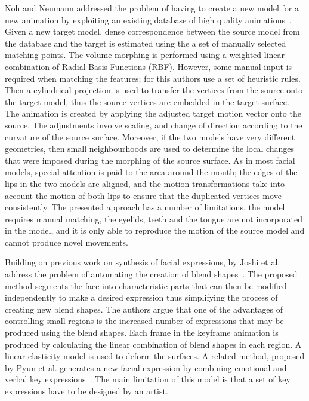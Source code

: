 \documentclass[11pt]{report}
\begin{document}
Noh and Neumann addressed the problem of having to create a new model for a new animation by exploiting an existing database of high quality animations~\cite{Noh:2001}. Given a new target model, dense correspondence between the source model from the database and the target is estimated using the a set of manually selected matching points. The volume morphing is performed using a weighted linear combination of Radial Basis Functions (RBF). However, some manual input is required when matching the features; for this authors use a set of heuristic rules. Then a cylindrical projection is used to transfer the vertices from the source onto the target model, thus the source vertices are embedded in the target surface. The animation is created by applying the adjusted target motion vector onto the source. The adjustments involve scaling, and change of direction according to the curvature of the source surface. Moreover, if the two models have very different geometries, then small neighbourhoods are used to determine the local changes that were imposed during the morphing of the source surface. As in most facial models, special attention is paid to the area around the mouth; the edges of the lips in the two models are aligned, and the motion transformations take into account the motion of both lips to ensure that the duplicated vertices move consistently. The presented approach has a number of limitations, the model requires manual matching, the eyelids, teeth and the tongue are not incorporated in the model, and it is only able to reproduce the motion of the source model and cannot produce novel movements. 

Building on previous work on synthesis of facial expressions, by Joshi et al. address the problem of automating the creation of blend shapes~\cite{Joshi:2003}. The proposed method segments the face into characteristic parts that can then be modified independently to make a desired expression thus simplifying the process of creating new blend shapes. The authors argue that one of the advantages of controlling small regions is the increased number of expressions that may be produced using the blend shapes. Each frame in the keyframe animation is produced by calculating the linear combination of blend shapes in each region. A linear elasticity model is used to deform the surfaces. A related method,  proposed by Pyun et al. generates a new facial expression by combining emotional and verbal key expressions~\cite{Pyun:2003}. The main limitation of this model is that a set of key expressions have to be designed by an artist. 
\end{document}
